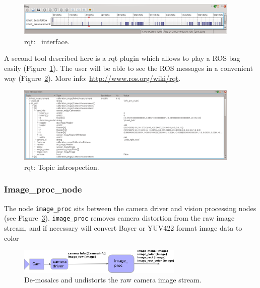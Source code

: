 \begin{figure}[!htbp]
 \centering
 \includegraphics[width=0.95\textwidth]{images/screenshots/rosbag01.png}
 \caption{rqt: \rosbag~interface.}
 \label{fig:rosbag01}
\end{figure}

A second tool described here is a rqt plugin which allows to play a ROS bag easily (Figure~\ref{fig:rosbag01}). The user will be able to see the ROS messages in a convenient way (Figure~\ref{fig:rosbag02}). More info: \url{http://www.ros.org/wiki/rqt}.

\begin{figure}[!htbp]
 \centering
 \includegraphics[width=0.95\textwidth]{images/screenshots/rosbag02.png}
 \caption{rqt: Topic introspection.}
 \label{fig:rosbag02}
\end{figure}

\subsubsection{Image\_proc\_node}

The node \texttt{image\_proc} sits between the camera driver and vision processing nodes (see Figure~\ref{fig:img_proc02}). \texttt{image\_proc} removes camera distortion from the raw image stream, and if necessary will convert Bayer or YUV422 format image data to color

\begin{figure}[!htbp]
 \centering
 \includegraphics[width=0.7\textwidth]{images/img_proc02.png}
 \caption{De-mosaics and undistorts the raw camera image stream.}
 \label{fig:img_proc02}
\end{figure}


